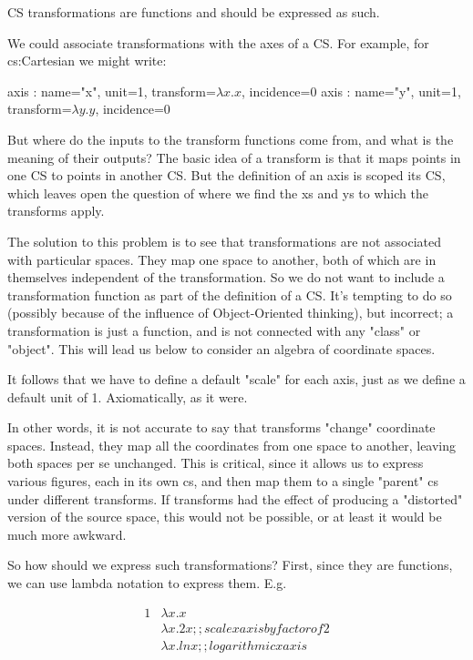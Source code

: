 \documentclass[12pt]{tufte-handout}
\numberwithin{equation}{subsection}
\numberwithin{equation}{subsection}
\begin{document}
  CS transformations are functions and should be expressed as such.

  We could associate transformations with the axes of a CS.  For
  example, for cs:Cartesian we might write:

  axis : {name="x", unit=1, transform=\(\lambda x.x\), incidence=0}
  axis : {name="y", unit=1, transform=\(\lambda y.y\), incidence=0}

  But where do the inputs to the transform functions come from, and what
  is the meaning of their outputs?  The basic idea of a transform is
  that it maps points in one CS to points in another CS.  But the
  definition of an axis is scoped its CS, which leaves open the question
  of where we find the xs and ys to which the transforms apply.

  The solution to this problem is to see that transformations are not
  associated with particular spaces.  They map one space to another,
  both of which are in themselves independent of the transformation.  So
  we do not want to include a transformation function as part of the
  definition of a CS.  It's tempting to do so (possibly because of the
  influence of Object-Oriented thinking), but incorrect; a
  transformation is just a function, and is not connected with any
  "class" or "object".  This will lead us below to consider an algebra
  of coordinate spaces.

  It follows that we have to define a default "scale" for each axis,
  just as we define a default unit of 1.  Axiomatically, as it were.

  In other words, it is not accurate to say that transforms "change"
  coordinate spaces.  Instead, they map all the coordinates from one
  space to another, leaving both spaces per se unchanged.  This is
  critical, since it allows us to express various figures, each in its
  own cs, and then map them to a single "parent" cs under different
  transforms.  If transforms had the effect of producing a "distorted"
  version of the source space, this would not be possible, or at least
  it would be much more awkward.

  So how should we express such transformations?  First, since they are
  functions, we can use lambda notation to express them.  E.g.

  {
    \begin{alignat}{1}
      & \lambda x.x \\
      & \lambda x.2x   ;; scale x axis by factor of 2 \\
      & \lambda x.ln x ;; logarithmic x axis
    \end{alignat}
  }
\end{document}
